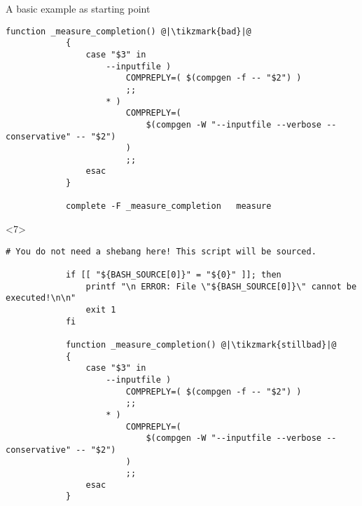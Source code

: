 \begin{frame}[fragile]{A basic example as starting point}
\begin{onlyenv}
\begin{lstlisting}[style=myBash, numbers=none, style=smaller]
            function _measure_completion() @|\tikzmark{bad}|@
            {
                case "$3" in
                    --inputfile )
                        COMPREPLY=( $(compgen -f -- "$2") )
                        ;;
                    * )
                        COMPREPLY=(
                            $(compgen -W "--inputfile --verbose --conservative" -- "$2")
                        )
                        ;;
                esac
            }

            complete -F _measure_completion   measure
        \end{lstlisting}
    \end{onlyenv}
    \begin{onlyenv}<7>
            \begin{lstlisting}[style=myBash, numbers=none, style=smaller]
            # You do not need a shebang here! This script will be sourced.

            if [[ "${BASH_SOURCE[0]}" = "${0}" ]]; then
                printf "\n ERROR: File \"${BASH_SOURCE[0]}\" cannot be executed!\n\n"
                exit 1
            fi

            function _measure_completion() @|\tikzmark{stillbad}|@
            {
                case "$3" in
                    --inputfile )
                        COMPREPLY=( $(compgen -f -- "$2") )
                        ;;
                    * )
                        COMPREPLY=(
                            $(compgen -W "--inputfile --verbose --conservative" -- "$2")
                        )
                        ;;
                esac
            }


\end{lstlisting}
\end{onlyenv}
\end{frame}
